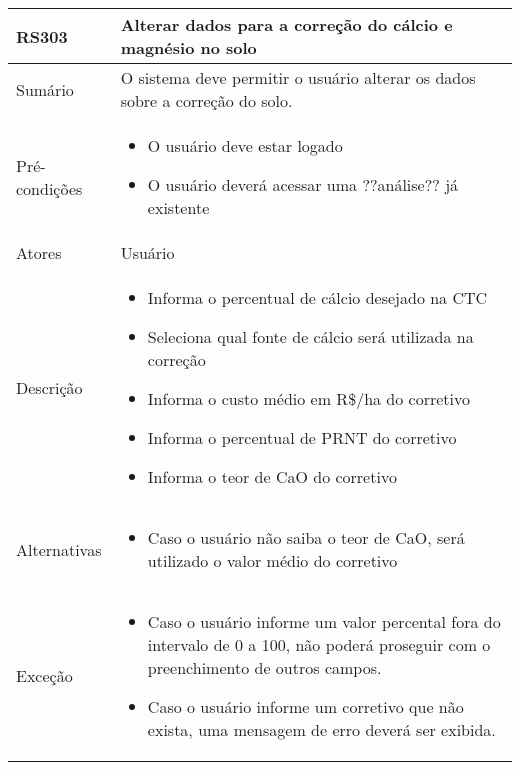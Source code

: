 \begin{quadro}[H]
    \begin{tabular}{|p{3cm}|p{11cm}|}
        \hline
        \textbf{RS303} & \textbf{Alterar dados para a correção do cálcio e magnésio no solo}          \\
        \hline
        Sumário        & O sistema deve permitir o usuário alterar os dados sobre a correção do solo. \\
        \hline
        Pré-condições  & \begin{itemize}
            \item O usuário deve estar logado
            \item O usuário deverá acessar uma ??análise?? já existente
        \end{itemize}                                                   \\
        \hline
        Atores         & Usuário                                                                      \\
        \hline
        Descrição      &
        \begin{itemize}
            \item Informa o percentual de cálcio desejado na CTC
            \item Seleciona qual fonte de cálcio será utilizada na correção
            \item Informa o custo médio em R\$/ha do corretivo
            \item Informa o percentual de PRNT do corretivo
            \item Informa o teor de CaO do corretivo
        \end{itemize}                                                                    \\
        \hline
        Alternativas   &
        \begin{itemize}
            \item Caso o usuário não saiba o teor de CaO, será utilizado o valor médio do corretivo
        \end{itemize}                                                                    \\
        \hline
        Exceção        &
        \begin{itemize}
            \item Caso o usuário informe um valor percental fora do intervalo de 0 a 100, não poderá proseguir com o preenchimento de outros campos.
            \item Caso o usuário informe um corretivo que não exista, uma mensagem de erro deverá ser exibida.
        \end{itemize}                                                                    \\
        \hline
    \end{tabular}
\end{quadro}

